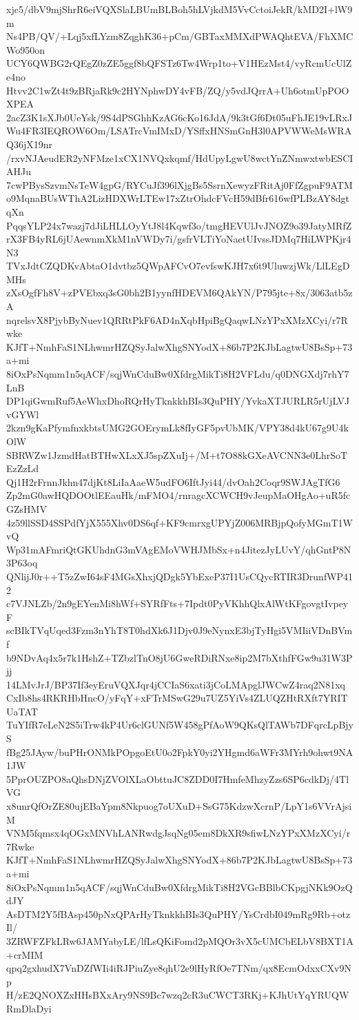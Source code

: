 xjc5/dbV9mjShrR6eiVQXSlaLBUmBLBoh5hLVjkdM5VvCctoiJekR/kMD2I+lW9m
Ns4PB/QV/+Lqj5xfLYzm8ZqghK36+pCm/GBTaxMMXdPWAQhtEVA/FhXMCWo950on
UCY6QWBG2rQEgZ0zZE5ggf8bQFSTz6Tw4Wrp1to+V1HEzMst4/vyRcmUcUlZe4no
Htvv2C1wZt4t9zBRjaRk9c2HYNphwDY4vFB/ZQ/y5vdJQrrA+Uh6otmUpPOOXPEA
2acZ3K1sXJb0UeYsk/9S4dPSGhhKzAG6cKo16JdA/9k3tGf6Dt05uFhJE19vLRxJ
Wu4FR3IEQROW6Om/LSATrcVmIMxD/YSffxHNSmGnH3l0APVWWeMsWRAQ36jX19nr
/rxvNJAeudER2yNFMze1xCX1NVQxkqmf/HdUpyLgwU8wctYnZNmwxtwbESCIAHJu
7cwPBysSzvmNsTeW4gpG/RYCuJf396lXjgBs5SsrnXewyzFRitAj0FfZgpuF9ATM
o9MqnaBUsWThA2LizHDXWrLTEw17xZtrOhdcFVcH59dBfr616wfPLBzAY8dgtqXn
PqqsYLP24x7wazj7dJiLHLLOyYtJ8l4Kqwf3o/tmgHEVUlJvJNOZ9o39JatyMRfZ
rX3FB4yRL6jUAewnmXkM1nVWDy7i/gsfrVLTiYoNaetUIvssJDMq7HiLWPKjr4N3
TVxJdtCZQDKvAbtaO1dvtbz5QWpAFCvO7evfswKJH7x6t9UluwzjWk/LlLEgDMHs
zXsOgfFh8V+zPVEbxq3sG0bh2B1yynfHDEVM6QAkYN/P795jte+8x/3063atb5zA
nqrelsvX8PjybByNuev1QRRtPkF6AD4nXqbHpiBgQaqwLNzYPxXMzXCyi/r7Rwke
KJfT+NmhFaS1NLhwmrHZQSyJalwXhgSNYodX+86b7P2KJbLagtwU8BsSp+73a+mi
8iOxPsNqmm1n5qACF/sqjWnCduBw0XfdrgMikTi8H2VFLdu/q0DNGXdj7rhY7LnB
DP1qiGwmRuf5AeWhxDhoRQrHyTknkkhBIs3QuPHY/YvkaXTJURLR5rUjLVJvGYWl
2kzn9gKaPfymfnxkbtsUMG2GOErymLk8fIyGF5pvUbMK/VPY38d4kU67g9U4kOlW
SBRWZw1JzmdHatBTHwXLxXJ5spZXuIj+/M+t7O88kGXeAVCNN3e0LhrSoTEzZzLd
Qj1H2rFrnnJkhn47djKt8LiIaAaeW5udFO6IftJyi44/dvOah2Coqr9SWJAgTfG6
Zp2mG0awHQDOOtlEEauHk/mFMO4/rnragcXCWCH9vJeupMaOHgAo+uR5fcGZsHMV
4z59llSSD4SSPdfYjX555Xhv0DS6qf+KF9cmrxgUPYjZ006MRBjpQofyMGmT1WvQ
Wp31mAFmriQtGKUhdnG3mVAgEMoVWHJMbSx+n4JitezJyLUvY/qhGntP8N3P63oq
QNlijJ0r++T5zZwI64sF4MGsXhxjQDgk5YbExeP37I1UsCQycRTIR3DrunfWP412
c7VJNLZb/2n9gEYenMi8hWf+SYRfFts+7Ipdt0PyVKhhQlxAlWtKFgovgtIvpeyF
scBIkTVqUqed3Fzm3nYhT8T0hdXk6J1Djv0J9eNynxE3bjTyHgi5VMIiiVDnBVmf
b9NDvAq4x5r7k1HshZ+TZbzlTnO8jU6GweRDiRNxe8ip2M7bXthfFGw9u31W3Pjj
14LMvJrJ/BP37If3eyEruVQXJqr4jCCIaS6xati3jCoLMApglJWCwZ4raq2N81xq
CxIb8hs4RKRHbHncO/yFqY+xFTrMSwG29u7UZ5YiVs4ZLUQZHtRXft7YRITUaTAT
TuYIfR7eLeN2S5iTrw4kP4Ur6clGUNf5W458gPfAoW9QKsQlTAWb7DFqrcLpBjyS
fBg25JAyw/buPHrONMkPOpgoEtU0o2FpkY0yi2YHgmd6aWFr3MYrh9ohwt9NA1JW
5PprOUZPO8aQhsDNjZVOlXLaObttuJC8ZDD0I7HmfeMhzyZzs6SP6cdkDj/4TlVG
x8unrQfOrZE80ujEBaYpm8Nkpuog7oUXuD+SsG75KdzwXcrnP/LpY1s6VVrAjsiM
VNM5fqmsx4qOGxMNVhLANRwdgJsqNg05em8DkXR9sfiwLNzYPxXMzXCyi/r7Rwke
KJfT+NmhFaS1NLhwmrHZQSyJalwXhgSNYodX+86b7P2KJbLagtwU8BsSp+73a+mi
8iOxPsNqmm1n5qACF/sqjWnCduBw0XfdrgMikTi8H2VGcBBlbCKpgjNKk9OzQdJY
AsDTM2Y5fBAsp450pNxQPArHyTknkkhBIs3QuPHY/YsCrdbI049mRg9Rb+otzIl/
3ZRWFZFkLRw6JAMYabyLE/lfLsQKiFomd2pMQOr3vX5cUMCbELbV8BXT1A+crMIM
qpq2gxhudX7VnDZfWIi4iRJPiuZye8qhU2e9lHyRfOe7TNm/qx8EcmOdxxCXv9Np
H/zE2QNOXZxHHsBXxAry9NS9Bc7wzq2cR3uCWCT3RKj+KJhUtYqYRUQWRmDlaDyi
